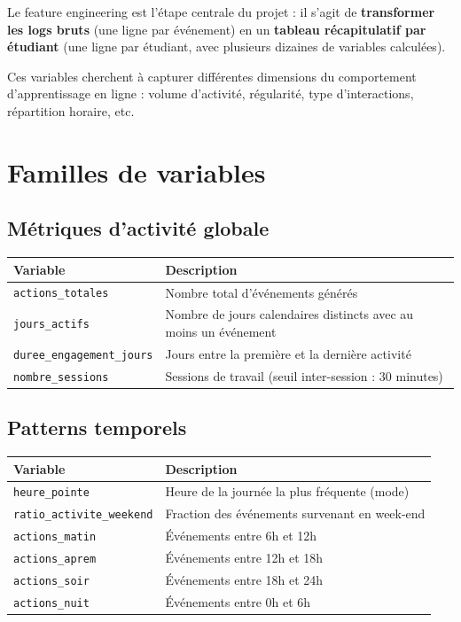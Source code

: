 \documentclass[12pt, a4paper, french]{report}
\begin{document}
Le feature engineering est l'étape centrale du projet : il s'agit de \textbf{transformer les logs bruts} (une ligne par événement) en un \textbf{tableau récapitulatif par étudiant} (une ligne par étudiant, avec plusieurs dizaines de variables calculées).

Ces variables cherchent à capturer différentes dimensions du comportement d'apprentissage en ligne : volume d'activité, régularité, type d'interactions, répartition horaire, etc.

\section{Familles de variables}

\subsection{Métriques d'activité globale}

\begin{center}
\begin{tabular}{lp{8cm}}
\toprule
\textbf{Variable} & \textbf{Description}\\
\midrule
\texttt{actions\_totales}         & Nombre total d'événements générés\\
\texttt{jours\_actifs}            & Nombre de jours calendaires distincts avec au moins un événement\\
\texttt{duree\_engagement\_jours} & Jours entre la première et la dernière activité\\
\texttt{nombre\_sessions}         & Sessions de travail (seuil inter-session : 30 minutes)\\
\bottomrule
\end{tabular}
\end{center}

\subsection{Patterns temporels}

\begin{center}
\begin{tabular}{lp{8cm}}
\toprule
\textbf{Variable} & \textbf{Description}\\
\midrule
\texttt{heure\_pointe}            & Heure de la journée la plus fréquente (mode)\\
\texttt{ratio\_activite\_weekend} & Fraction des événements survenant en week-end\\
\texttt{actions\_matin}           & Événements entre 6h et 12h\\
\texttt{actions\_aprem}           & Événements entre 12h et 18h\\
\texttt{actions\_soir}            & Événements entre 18h et 24h\\
\texttt{actions\_nuit}            & Événements entre 0h et 6h\\
\bottomrule
\end{tabular}
\end{center}
\end{document}
